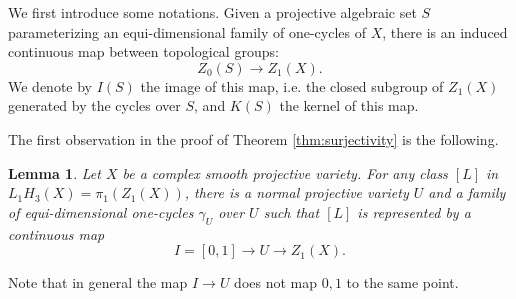 \documentclass{amsart}
\newtheorem{lem}[theorem]{Lemma}
\theoremstyle{definition}
\theoremstyle{remark}
\begin{document}
We first introduce some notations. Given a projective algebraic set $S$ parameterizing an equi-dimensional family of one-cycles of $X$, there is an induced continuous map between topological groups:
\[
Z_0(S) \to Z_1(X).
\]
We denote by $I(S)$ the image of this map, i.e. the closed subgroup of $Z_1(X)$ generated by the cycles over $S$, and $K(S)$ the kernel of this map.

The first observation in the proof of Theorem \ref{thm:surjectivity} is the following.
\begin{lem}\label{lem:single}
Let $X$ be a complex smooth projective variety.
For any class $[L]$ in $L_1H_3(X) =\pi_1(Z_1(X))$,
there is a normal projective variety $U$ and a family of equi-dimensional one-cycles $\gamma_U$ over $U$ such that $[L]$ is represented by a continuous map
\[
I=[0, 1] \to U \to Z_1(X).
\]
\end{lem}

Note that in general the map $I \to U$ does not map $0, 1$ to the same point.
\end{document}
